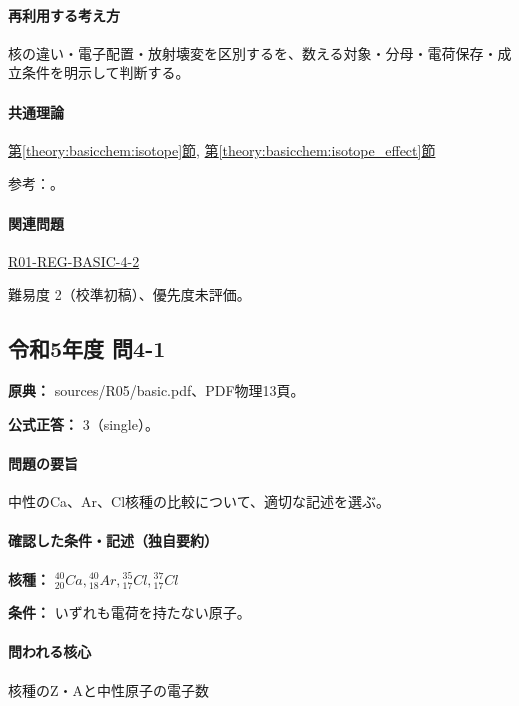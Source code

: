 \paragraph{再利用する考え方} 核の違い・電子配置・放射壊変を区別するを、数える対象・分母・電荷保存・成立条件を明示して判断する。

\paragraph{共通理論} \hyperref[theory:basicchem:isotope]{第\ref*{theory:basicchem:isotope}節}, \hyperref[theory:basicchem:isotope_effect]{第\ref*{theory:basicchem:isotope_effect}節}

\par 参考：\cite{iupac_isotopes,iupac_isotope_effect}。

\paragraph{関連問題} \hyperref[q:r01-reg-basic-4-2]{R01-REG-BASIC-4-2}

\par 難易度 2（校準初稿）、優先度未評価。

\subsection{令和5年度 問4-1}
\label{q:r05-reg-basic-4-1}

\noindent\textbf{原典：} sources/R05/basic.pdf、PDF物理13頁。

\textbf{公式正答：} 3（single）。

\paragraph{問題の要旨} 中性のCa、Ar、Cl核種の比較について、適切な記述を選ぶ。

\paragraph{確認した条件・記述（独自要約）}\mbox{}\par

\noindent\textbf{核種：} \({}^{40}_{20}Ca,{}^{40}_{18}Ar,{}^{35}_{17}Cl,{}^{37}_{17}Cl\)\par

\noindent\textbf{条件：} いずれも電荷を持たない原子。\par

\paragraph{問われる核心} 核種のZ・Aと中性原子の電子数

